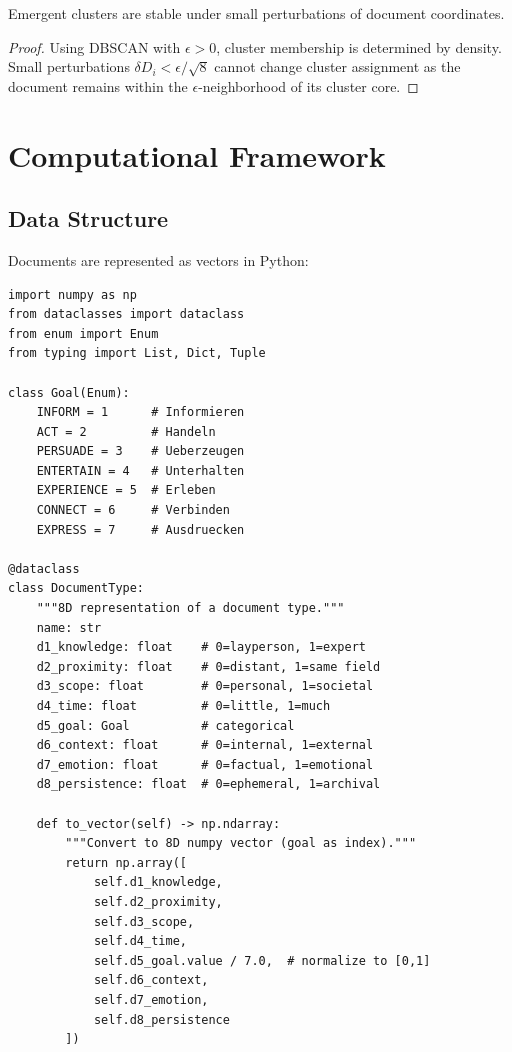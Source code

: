 \begin{proposition}
Emergent clusters are stable under small perturbations of document coordinates.
\end{proposition}

\begin{proof}
Using DBSCAN with $\epsilon > 0$, cluster membership is determined by density.
Small perturbations $\delta D_i < \epsilon/\sqrt{8}$ cannot change cluster assignment
as the document remains within the $\epsilon$-neighborhood of its cluster core.
\end{proof}


\section{Computational Framework}
\label{sec:doctype-computation}

\subsection{Data Structure}

Documents are represented as vectors in Python:

\begin{verbatim}
import numpy as np
from dataclasses import dataclass
from enum import Enum
from typing import List, Dict, Tuple

class Goal(Enum):
    INFORM = 1      # Informieren
    ACT = 2         # Handeln
    PERSUADE = 3    # Ueberzeugen
    ENTERTAIN = 4   # Unterhalten
    EXPERIENCE = 5  # Erleben
    CONNECT = 6     # Verbinden
    EXPRESS = 7     # Ausdruecken

@dataclass
class DocumentType:
    """8D representation of a document type."""
    name: str
    d1_knowledge: float    # 0=layperson, 1=expert
    d2_proximity: float    # 0=distant, 1=same field
    d3_scope: float        # 0=personal, 1=societal
    d4_time: float         # 0=little, 1=much
    d5_goal: Goal          # categorical
    d6_context: float      # 0=internal, 1=external
    d7_emotion: float      # 0=factual, 1=emotional
    d8_persistence: float  # 0=ephemeral, 1=archival

    def to_vector(self) -> np.ndarray:
        """Convert to 8D numpy vector (goal as index)."""
        return np.array([
            self.d1_knowledge,
            self.d2_proximity,
            self.d3_scope,
            self.d4_time,
            self.d5_goal.value / 7.0,  # normalize to [0,1]
            self.d6_context,
            self.d7_emotion,
            self.d8_persistence
        ])
\end{verbatim}

